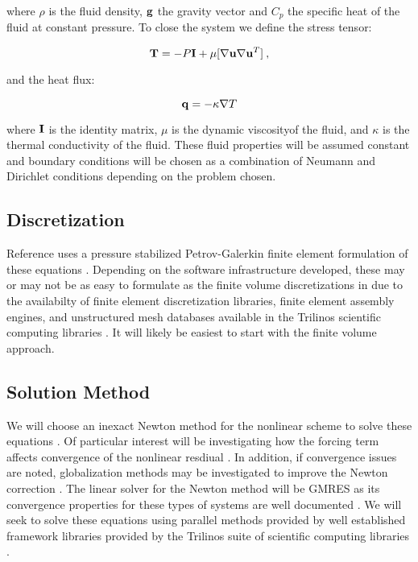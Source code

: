 \documentclass[letterpaper,12pt]{article}
\begin{document}
where $\rho$ is the fluid density, $\mathbf{g}$ the gravity vector and
$C_p$ the specific heat of the fluid at constant pressure. To close
the system we define the stress tensor:

\begin{equation}
  \mathbf{T} = -P \mathbf{I} + \mu [ \nabla \mathbf{u} \nabla \mathbf{u}^{T} ] \:,
  \label{eq:stress_tensor}
\end{equation}

and the heat flux:

\begin{equation}
  \mathbf{q} = -\kappa \nabla T
  \label{eq:heat_flux}
\end{equation}

where $\mathbf{I}$ is the identity matrix, $\mu$ is the dynamic
viscosityof the fluid, and $\kappa$ is the thermal conductivity of the
fluid. These fluid properties will be assumed constant and boundary
conditions will be chosen as a combination of Neumann and Dirichlet
conditions depending on the problem chosen.

\subsection{Discretization}
Reference \cite{shadid_1997} uses a pressure stabilized
Petrov-Galerkin finite element formulation of these equations
\cite{hughes_1986}. Depending on the software infrastructure
developed, these may or may not be as easy to formulate as the finite
volume discretizations in \cite{mchugh_1994} due to the availabilty of
finite element discretization libraries, finite element assembly
engines, and unstructured mesh databases available in the Trilinos
scientific computing libraries \cite{trilinos_2005}. It will likely be
easiest to start with the finite volume approach.

\subsection{Solution Method}
We will choose an inexact Newton method for the nonlinear scheme to
solve these equations \cite{dembo_1982}. Of particular interest will
be investigating how the forcing term affects convergence of the
nonlinear resdiual \cite{eisenstat_1996}. In addition, if convergence
issues are noted, globalization methods may be investigated to improve
the Newton correction \cite{pawlowski_2006}. The linear solver for the
Newton method will be GMRES as its convergence properties for these
types of systems are well documented \cite{saad_1986}. We will seek to
solve these equations using parallel methods provided by well
established framework libraries provided by the Trilinos suite of
scientific computing libraries \cite{trilinos_2005}.
\end{document}
